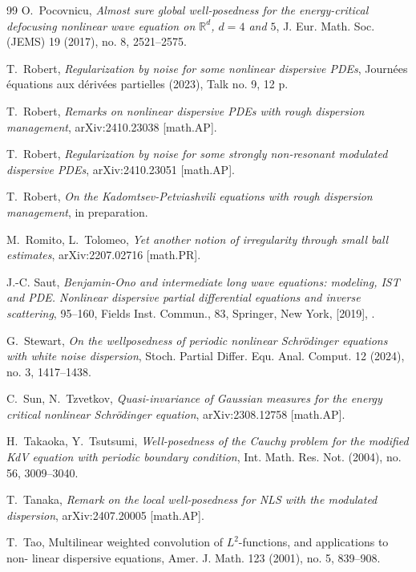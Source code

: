 \documentclass[letterpaper, 11pt,  reqno]{amsart}
\newcommand{\1}{\hspace{0.5mm}\text{I}\hspace{0.5mm}}
\newcommand{\R}{\mathbb{R}}
\numberwithin{equation}{section}
\numberwithin{theorem}{section}
\begin{document}
\begin{thebibliography}{99}
O.~Pocovnicu, 
{\it Almost sure global well-posedness for the energy-critical defocusing nonlinear wave equation on $\R^d$,
 $d = 4$ and $5$}, J. Eur. Math. Soc. (JEMS) 19 (2017), no. 8, 2521--2575.






T.~Robert, 
{\it Regularization by noise for some nonlinear dispersive PDEs},
 Journ\'ees \'equations aux d\'eriv\'ees partielles (2023), Talk no. 9, 12 p. 





T.~Robert, 
{\it Remarks on nonlinear dispersive PDEs with rough dispersion management}, 
arXiv:2410.23038 [math.AP].




T.~Robert, 
{\it Regularization by noise for some strongly non-resonant modulated dispersive PDEs}, 
arXiv:2410.23051 [math.AP].


T.~Robert, 
{\it  On the Kadomtsev-Petviashvili equations with rough dispersion management}, 
 in preparation.



M.~Romito, L.~Tolomeo, 
{\it Yet another notion of irregularity through small ball estimates},
arXiv:2207.02716 [math.PR].


	
J.-C. Saut,
 {\it Benjamin-Ono and intermediate long wave equations: modeling, IST and PDE. Nonlinear
dispersive partial differential equations and inverse scattering}, 
95--160, Fields Inst. Commun., 83, Springer, New York, [2019], .


G.~Stewart, 
{\it On the wellposedness of periodic nonlinear Schr\"odinger equations with white noise dispersion}, 
Stoch. Partial Differ. Equ. Anal. Comput. 12 (2024), no. 3, 1417--1438.


C.~Sun, N.~Tzvetkov,
{\it 
Quasi-invariance of Gaussian measures for the   energy critical nonlinear Schr\"odinger equation}, 
arXiv:2308.12758 [math.AP].



H.~Takaoka, Y.~Tsutsumi, 
{\it Well-posedness of the Cauchy problem for the modified KdV equation with periodic boundary condition},
 Int. Math. Res. Not. (2004), no. 56, 3009--3040. 




T.~Tanaka, 
{\it Remark on the local well-posedness for NLS with the modulated dispersion}, 
arXiv:2407.20005 [math.AP].


T.~Tao, 
{Multilinear weighted convolution of $L^2$-functions, and applications to non-
linear dispersive equations}, Amer. J. Math. 123 (2001), no. 5, 839--908.








\end{thebibliography}
\end{document}
